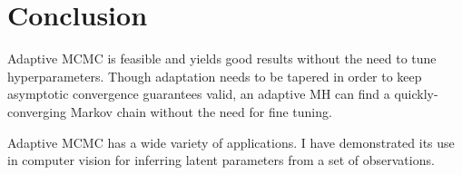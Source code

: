 \documentclass{article}
\begin{document}
\section{Conclusion}

Adaptive MCMC is feasible and yields good results without the need to tune hyperparameters. Though adaptation needs to be tapered in order to keep asymptotic convergence guarantees valid, an adaptive MH can find a quickly-converging Markov chain without the need for fine tuning.

Adaptive MCMC has a wide variety of applications. I have demonstrated its use in computer vision for inferring latent parameters from a set of observations.

\nocite{*}


\end{document}
